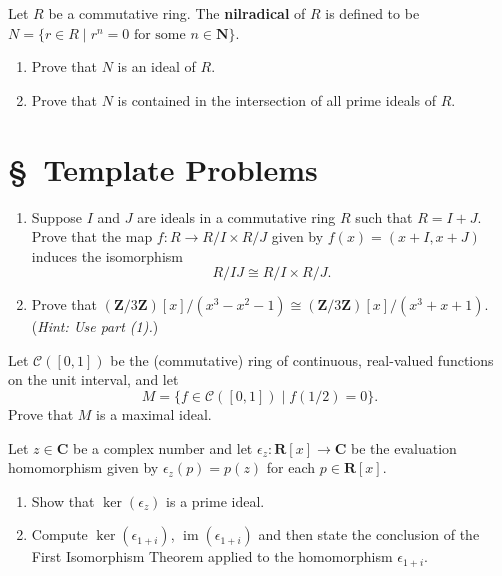 \documentclass[11pt,twoside,openany]{memoir}
\begin{document}
    \begin{exercise}
    Let $R$ be a commutative ring. The \textbf{nilradical} of $R$ is defined to be $N=\{r\in R\mid r^n=0 \text{ for some } n\in \mathbf{N}\}$.
    \begin{enumerate}[label = (\arabic*)]
        \item Prove that $N$ is an ideal of $R$.
        \item Prove that $N$ is contained in the intersection of all prime ideals of $R$.
    \end{enumerate}
    \end{exercise}

\section*{\S\ Template Problems}
\begin{exercise}
    \phantom{a}
    \begin{enumerate}[label = (\arabic*)]
        \item Suppose $I$ and $J$ are ideals in a commutative ring $R$ such that $R=I+J$. Prove that the map $f:R\to R/I\times R/J$ given by $f(x)=(x+I,x+J)$ induces the isomorphism
        \[
            R/IJ \cong R/I \times R/J.
        \]
        \item Prove that $\left(\mathbf{Z}/3\mathbf{Z}\right)[x]/(x^3-x^2-1)\cong \left(\mathbf{Z}/3\mathbf{Z}\right)[x]/(x^3+x+1)$. (\textit{Hint: Use part (1).})
    \end{enumerate}
    \end{exercise}
    
    \begin{exercise}
    Let $\mathcal{C}([0,1])$ be the (commutative) ring of continuous, real-valued functions on the unit interval, and let
    \[
        M=\{f\in \mathcal{C}([0,1]) \mid f(1/2)=0\}.
    \]
    Prove that $M$ is a maximal ideal.
    \end{exercise}
    
    \begin{exercise}
    Let $z \in \mathbf{C}$ be a complex number and let $\epsilon_z:\mathbf{R}[x]\to \mathbf{C}$ be the evaluation homomorphism given by $\epsilon_z(p)=p(z)$ for each $p \in \mathbf{R}[x]$.
    \begin{enumerate}[label = (\arabic*)]
        \item Show that $\ker(\epsilon_z)$ is a prime ideal.
        \item Compute $\ker(\epsilon_{1+i})$, $\operatorname{im}(\epsilon_{1+i})$ and then state the conclusion of the First Isomorphism Theorem applied to the homomorphism $\epsilon_{1+i}$.
    \end{enumerate}
    \end{exercise}
    
\end{document}
